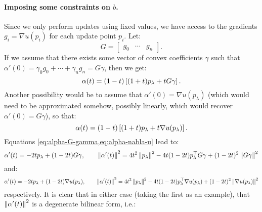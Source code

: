 \documentclass[eikonal.tex]{subfiles}
\begin{document}
\paragraph{Imposing some constraints on $b$.} Since we only perform
updates using fixed values, we have access to the gradients
$g_i = \nabla u(p_i)$ for each update point $p_i$. Let:
\begin{equation}
  G = \begin{bmatrix} g_0 & \cdots & g_n \end{bmatrix}.
\end{equation}
If we assume that there exists some vector of convex coefficients
$\gamma$ such that
$\alpha'(0) = \gamma_0 g_0 + \cdots + \gamma_n g_n = G\gamma$, then we
get:
\begin{equation}\label{eq:alpha-G-gamma}
  \alpha(t) = (1 - t) \left[(1 + t) p_\lambda + tG\gamma\right].
\end{equation}
Another possibility would be to assume that
$\alpha'(0) = \nabla u(p_\lambda)$ (which would need to be
approximated somehow, possibly linearly, which would recover
$\alpha'(0) = G\gamma$), so that:
\begin{equation}\label{eq:alpha-nabla-u}
  \alpha(t) = (1 - t) \left[(1 + t) p_\lambda + t \nabla u(p_\lambda)\right].
\end{equation}
Equations \cref{eq:alpha-G-gamma,eq:alpha-nabla-u} lead to:
\begin{equation}
  \alpha'(t) = -2tp_\lambda + (1 - 2t)G\gamma, \qquad \left\|\alpha'(t)\right\|^2 = 4t^2 \left\|p_\lambda\right\|^2 - 4t(1-2t) p_\lambda^\top G\gamma + (1 - 2t)^2 \left\|G\gamma\right\|^2
\end{equation}
and:
\begin{equation}
  \alpha'(t) = -2tp_\lambda + (1 - 2t)\nabla u(p_\lambda), \qquad \left\|\alpha'(t)\right\|^2 = 4t^2 \left\|p_\lambda\right\|^2 - 4t(1-2t) p_\lambda^\top \nabla u(p_\lambda) + (1 - 2t)^2 \left\|\nabla u(p_\lambda)\right\|^2
\end{equation}
respectively. It is clear that in either case (taking the first as an
example), that $\left\|\alpha'(t)\right\|^2$ is a degenerate bilinear form,
i.e.:
\end{document}
